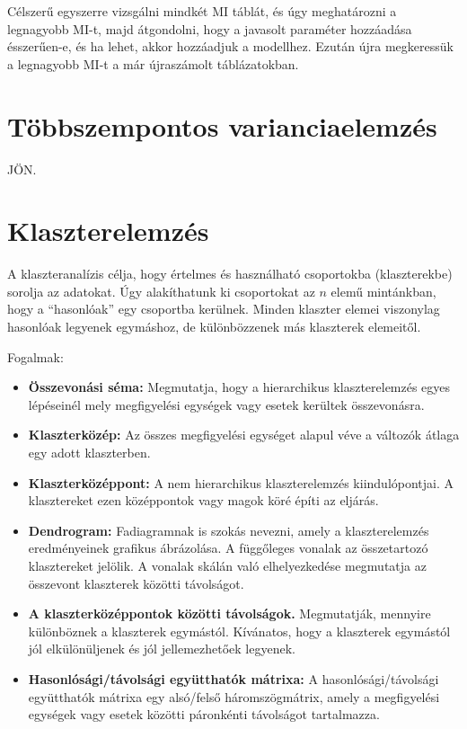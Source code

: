 \documentclass[
  letterpaper,
]{krantz}
\providecommand{\tightlist}{%
  \setlength{\itemsep}{0pt}\setlength{\parskip}{0pt}}\usepackage{longtable,booktabs,array}
\begin{document}
Célszerű egyszerre vizsgálni mindkét MI táblát, és úgy meghatározni a
legnagyobb MI-t, majd átgondolni, hogy a javasolt paraméter hozzáadása
ésszerűen-e, és ha lehet, akkor hozzáadjuk a modellhez. Ezután újra
megkeressük a legnagyobb MI-t a már újraszámolt táblázatokban.


\hypertarget{sec-tobbszempontos-varianciaelemzes}{%
\chapter{Többszempontos
varianciaelemzés}\label{sec-tobbszempontos-varianciaelemzes}}

JÖN.


\hypertarget{sec-klaszterelemzes}{%
\chapter{Klaszterelemzés}\label{sec-klaszterelemzes}}

A klaszteranalízis célja, hogy értelmes és használható csoportokba
(klaszterekbe) sorolja az adatokat. Úgy alakíthatunk ki csoportokat az
\(n\) elemű mintánkban, hogy a ``hasonlóak'' egy csoportba kerülnek.
Minden klaszter elemei viszonylag hasonlóak legyenek egymáshoz, de
különbözzenek más klaszterek elemeitől.

Fogalmak:

\begin{itemize}
\tightlist
\item
  \textbf{Összevonási séma:} Megmutatja, hogy a hierarchikus
  klaszterelemzés egyes lépéseinél mely megfigyelési egységek vagy
  esetek kerültek összevonásra.
\item
  \textbf{Klaszterközép:} Az összes megfigyelési egységet alapul véve a
  változók átlaga egy adott klaszterben.
\item
  \textbf{Klaszterközéppont:} A nem hierarchikus klaszterelemzés
  kiindulópontjai. A klasztereket ezen középpontok vagy magok köré építi
  az eljárás.
\item
  \textbf{Dendrogram:} Fadiagramnak is szokás nevezni, amely a
  klaszterelemzés eredményeinek grafikus ábrázolása. A függőleges
  vonalak az összetartozó klasztereket jelölik. A vonalak skálán való
  elhelyezkedése megmutatja az összevont klaszterek közötti távolságot.
\item
  \textbf{A klaszterközéppontok közötti távolságok.} Megmutatják,
  mennyire különböznek a klaszterek egymástól. Kívánatos, hogy a
  klaszterek egymástól jól elkülönüljenek és jól jellemezhetőek
  legyenek.
\item
  \textbf{Hasonlósági/távolsági együtthatók mátrixa:} A
  hasonlósági/távolsági együtthatók mátrixa egy alsó/felső
  háromszögmátrix, amely a megfigyelési egységek vagy esetek közötti
  páronkénti távolságot tartalmazza.
\end{itemize}
\end{document}
